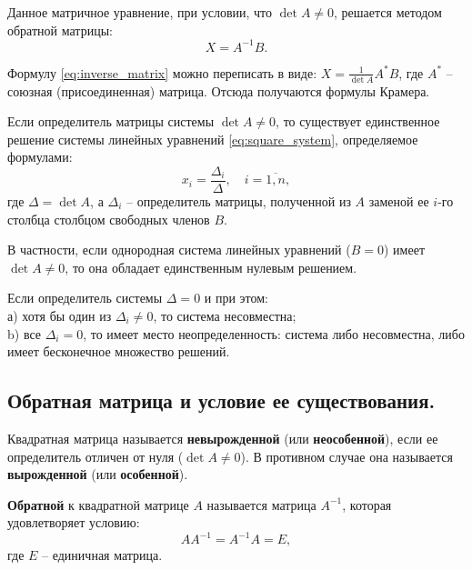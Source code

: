 \documentclass[10pt]{article}
\begin{document}
Данное матричное уравнение, при условии, что \(\det A \neq 0\), решается методом обратной матрицы:
\begin{equation} \label{eq:inverse_matrix}
X = A^{-1} B.
\end{equation}

Формулу \eqref{eq:inverse_matrix} можно переписать в виде: \(X = \frac{1}{\det A} A^{*} B\), где \(A^{*}\) – союзная (присоединенная) матрица. Отсюда получаются формулы Крамера.

\begin{theorem}
Если определитель матрицы системы \(\det A \neq 0\), то существует единственное решение системы линейных уравнений \eqref{eq:square_system}, определяемое формулами:
\[
x_i = \frac{\Delta_i}{\Delta},\quad i = \overline{1,n},
\]
где \(\Delta = \det A\), а \(\Delta_i\) – определитель матрицы, полученной из \(A\) заменой ее \(i\)-го столбца столбцом свободных членов \(B\).
\end{theorem}

\begin{remark}
В частности, если однородная система линейных уравнений (\(B = 0\)) имеет \(\det A \neq 0\), то она обладает единственным нулевым решением.
\end{remark}

\begin{remark}
Если определитель системы \(\Delta = 0\) и при этом: \\
а) хотя бы один из \(\Delta_i \neq 0\), то система несовместна; \\
b) все \(\Delta_i = 0\), то имеет место неопределенность: система либо несовместна, либо имеет бесконечное множество решений.
\end{remark}

\subsection*{Обратная матрица и условие ее существования.}

\begin{definition}
Квадратная матрица называется \textbf{невырожденной} (или \textbf{неособенной}), если ее определитель отличен от нуля (\(\det A \neq 0\)). В противном случае она называется \textbf{вырожденной} (или \textbf{особенной}).
\end{definition}

\begin{definition}
\textbf{Обратной} к квадратной матрице \(A\) называется матрица \(A^{-1}\), которая удовлетворяет условию:
\begin{equation} \label{eq:inverse_def}
A A^{-1} = A^{-1} A = E,
\end{equation}
где \(E\) – единичная матрица.
\end{definition}
\end{document}
